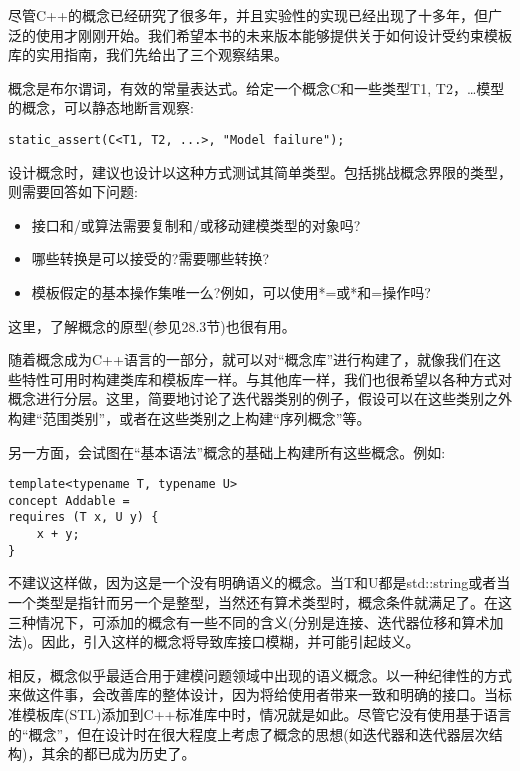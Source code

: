 
尽管C++的概念已经研究了很多年，并且实验性的实现已经出现了十多年，但广泛的使用才刚刚开始。我们希望本书的未来版本能够提供关于如何设计受约束模板库的实用指南，我们先给出了三个观察结果。


概念是布尔谓词，有效的常量表达式。给定一个概念C和一些类型T1, T2，…模型的概念，可以静态地断言观察:

\begin{lstlisting}[style=styleCXX]
static_assert(C<T1, T2, ...>, "Model failure");
\end{lstlisting}

设计概念时，建议也设计以这种方式测试其简单类型。包括挑战概念界限的类型，则需要回答如下问题:

\begin{itemize}
\item 
接口和/或算法需要复制和/或移动建模类型的对象吗?

\item 
哪些转换是可以接受的?需要哪些转换?

\item 
模板假定的基本操作集唯一么?例如，可以使用*=或*和=操作吗?
\end{itemize}

这里，了解概念的原型(参见28.3节)也很有用。


随着概念成为C++语言的一部分，就可以对“概念库”进行构建了，就像我们在这些特性可用时构建类库和模板库一样。与其他库一样，我们也很希望以各种方式对概念进行分层。这里，简要地讨论了迭代器类别的例子，假设可以在这些类别之外构建“范围类别”，或者在这些类别之上构建“序列概念”等。

另一方面，会试图在“基本语法”概念的基础上构建所有这些概念。例如:

\begin{lstlisting}[style=styleCXX]
template<typename T, typename U>
concept Addable =
requires (T x, U y) {
	x + y;
}
\end{lstlisting}

不建议这样做，因为这是一个没有明确语义的概念。当T和U都是std::string或者当一个类型是指针而另一个是整型，当然还有算术类型时，概念条件就满足了。在这三种情况下，可添加的概念有一些不同的含义(分别是连接、迭代器位移和算术加法)。因此，引入这样的概念将导致库接口模糊，并可能引起歧义。

相反，概念似乎最适合用于建模问题领域中出现的语义概念。以一种纪律性的方式来做这件事，会改善库的整体设计，因为将给使用者带来一致和明确的接口。当标准模板库(STL)添加到C++标准库中时，情况就是如此。尽管它没有使用基于语言的“概念”，但在设计时在很大程度上考虑了概念的思想(如迭代器和迭代器层次结构)，其余的都已成为历史了。

